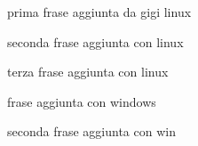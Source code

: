 \documentclass[a4paper]{article}
\begin{document}
prima frase aggiunta da gigi linux

seconda frase aggiunta con linux

terza frase aggiunta con linux

frase aggiunta con windows

seconda frase aggiunta con win
\end{document}
